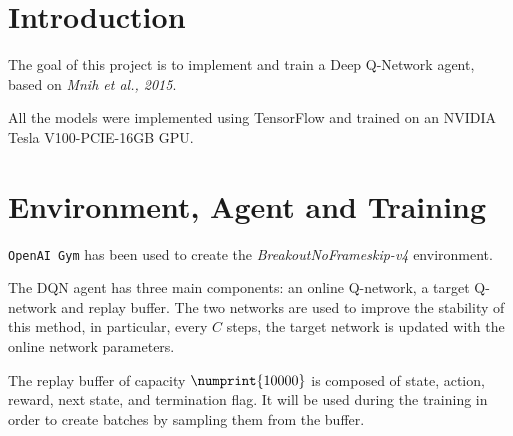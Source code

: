 \documentclass[a4paper,12pt]{article} %
\begin{document}
	\thispagestyle{empty}  
	\vspace{0.4cm}

	
	\section{Introduction}
	\label{section:intro}
	
	The goal of this project is to implement and train a Deep Q-Network agent, based on \textit{Mnih et al., 2015}.
	
	All the models were implemented using TensorFlow and trained on an NVIDIA Tesla V100-PCIE-16GB GPU.
	
	\section{Environment, Agent and Training}
	\label{section:agent}	
	\texttt{OpenAI Gym} has been used to create the \textit{BreakoutNoFrameskip-v4} environment. 
	
	The DQN agent has three main components: an online Q-network, a target Q-network and replay buffer.
	The two networks are used to improve the stability of this method, in particular, every $C$ steps, the target network is updated with the online network parameters.
	
	The replay buffer of capacity $\numprint{10000}$ is composed of state, action, reward, next state, and termination flag. It will be used during the training in order to create batches by sampling them from the buffer.
	
\end{document}
